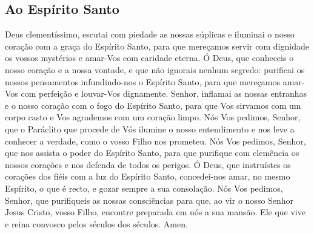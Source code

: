 \subsection{Ao Espírito Santo}
 Deus clementíssimo, escutai com piedade as nossas súplicas e iluminai o nosso coração com a graça do Espírito Santo, para que mereçamos servir com dignidade os vossos mystérios e amar-Vos com caridade eterna. Ó Deus, que conheceis o nosso coração e a nossa vontade, e que não ignorais nenhum segredo: purificai os nossos pensamentos infundindo-nos o Espírito Santo, para que mereçamos amar-Vos com perfeição e louvar-Vos dignamente. Senhor, inflamai as nossas entranhas e o nosso coração com o fogo do Espírito Santo, para que Vos sirvamos com um corpo casto e Vos agrademos com um coração limpo. Nós Vos pedimos, Senhor, que o Paráclito que procede de Vós ilumine o nosso entendimento e nos leve a conhecer a verdade, como o vosso Filho nos prometeu. Nós Vos pedimos, Senhor, que nos assista o poder do Espírito Santo, para que purifique com clemência os nossos corações e nos defenda de todos os perigos. Ó Deus, que instruístes os corações dos fiéis com a luz do Espírito Santo, concedei-nos amar, no mesmo Espírito, o que é recto, e gozar sempre a sua consolação. Nós Vos pedimos, Senhor, que purifiqueis as nossas consciências para que, ao vir o nosso Senhor Jesus Cristo, vosso Filho, encontre preparada em nós a sua mansão. Ele que vive e reina convosco pelos séculos dos séculos. Amen.

